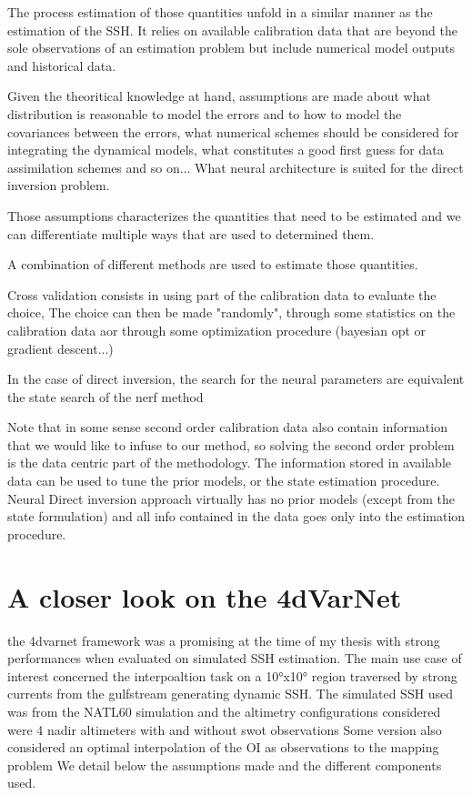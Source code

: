 \begin{bibunit}
The process estimation of those quantities unfold in a similar manner as the estimation of the SSH.
It relies on available calibration data that are beyond the sole observations of an estimation problem but include numerical model outputs and historical data.

Given the theoritical knowledge at hand, assumptions are made about what distribution is reasonable to model the errors and to how to model the covariances between the errors, what numerical schemes should be considered for integrating the dynamical models, what constitutes a good first guess for data assimilation schemes and so on... What neural architecture is suited for the direct inversion problem.

Those assumptions characterizes the quantities that need to be estimated and we can differentiate multiple ways that are used to determined them.

A combination of different methods are used to estimate those quantities.

Cross validation consists in using part of the calibration data to evaluate the choice, 
The choice can then be made "randomly", through some statistics on the calibration data aor through some optimization procedure (bayesian opt or gradient descent...)

In the case of direct inversion, the search for the neural parameters are equivalent the state search of the nerf method

Note that in some sense second order calibration data also contain information that we would like to infuse to our method, so solving the second order problem is the data centric part of the methodology. 
The information stored in available data can be used to tune the prior models, or the state estimation procedure.
Neural Direct inversion approach virtually has no prior models (except from the state formulation) and all info contained in the data goes only into the estimation procedure.

\section{A closer look on the 4dVarNet}
the 4dvarnet framework was a promising at the time of my thesis with strong performances when evaluated on simulated SSH estimation.
The main use case of interest concerned the interpoaltion task on a 10°x10° region traversed by strong currents from the gulfstream generating dynamic SSH.
The simulated SSH used was from the NATL60 simulation and the altimetry configurations considered were 4 nadir altimeters with and without swot observations
Some version also considered an optimal interpolation of the OI as observations to the mapping problem
We detail below the assumptions made and the different components used.



\end{bibunit}
